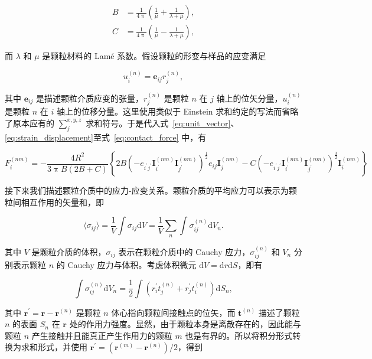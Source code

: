 \begin{align}
  B &= \frac{1}{4\uppi}\left(\frac{1}{\mu} + \frac{1}{\lambda + \mu}\right),\\
  C &= \frac{1}{4\uppi}\left(\frac{1}{\mu} - \frac{1}{\lambda + \mu}\right),
\end{align}

而 $\lambda$ 和 $\mu$ 是颗粒材料的 Lamé 系数。假设颗粒的形变与样品的应变满足

\begin{equation}
  {u}_{i}^{(n)} = \mathbf{e}_{ij}{r}_{j}^{(n)}\label{eq:strain_displacement},
\end{equation}

其中 $\mathbf{e}_{ij}$ 是描述颗粒介质应变的张量，${r}_{j}^{(n)}$ 是颗粒 $n$ 在 $j$ 轴上的位矢分量，${u}_{i}^{(n)}$ 是颗粒 $n$ 在 $i$ 轴上的位移分量。这里使用类似于 Einstein 求和约定的写法而省略了原本应有的 $\sum_{j}^{x,y,z}$ 求和符号。于是代入式~\eqref{eq:unit_vector}、\eqref{eq:strain_displacement}至式~\eqref{eq:contact_force} 中，有

\begin{equation}
  F_{i}^{(nm)} = -\frac{4R^{2}}{3\uppi B(2B+C)}\left\{2B\left(-e_{i^{\prime}j^{\prime}}\mathbf{I}_{i^{\prime}}^{(nm)}\mathbf{I}_{j^{\prime}}^{(nm)}\right)^{\frac{1}{2}}e_{ij}\mathbf{I}_{j}^{(nm)} - C\left(-e_{i^{\prime}j^{\prime}}\mathbf{I}^{(nm)}_{i^{\prime}}\mathbf{I}_{j^{\prime}}^{(nm)}\right)^{\frac{3}{2}}\mathbf{I}_{i}^{(nm)}\right\}
\end{equation}

接下来我们描述颗粒介质中的应力-应变关系。颗粒介质的平均应力可以表示为颗粒间相互作用的矢量和，即

\begin{equation}
  \langle\sigma_{ij}\rangle = \frac{1}{V}\int\sigma_{ij}\mathrm{d}V = \frac{1}{V}\sum_{n}\int\sigma_{ij}^{(n)}\mathrm{d}V_{n}.
\end{equation}

其中 $V$ 是颗粒介质的体积，$\sigma_{ij}$ 表示在颗粒介质中的 Cauchy 应力，$\sigma_{ij}^{(n)}$ 和 $V_{n}$ 分别表示颗粒 $n$ 的 Cauchy 应力与体积。考虑体积微元 $\mathrm{d}V = \mathrm{d}r\mathrm{d}S$，即有

\begin{equation}
  \int\sigma_{ij}^{(n)}\mathrm{d}V_{n} = \frac{1}{2}\int\left(r_{i}^{\prime}t_{j}^{(n)} + r_{j}^{\prime}t_{i}^{(n)}\right)\mathrm{d}S_{n},
\end{equation}

其中 $\mathbf{r}^{\prime} = \mathbf{r} - \mathbf{r}^{(n)} $ 是颗粒 $n$ 体心指向颗粒间接触点的位矢，而 $\mathbf{t}^{(n)}$ 描述了颗粒 $n$ 的表面 $S_{n}$ 在 $\mathbf{r}$ 处的作用力强度。显然，由于颗粒本身是离散存在的，因此能与颗粒 $n$ 产生接触并且能真正产生作用力的颗粒 $m$ 也是有界的。所以将积分形式转换为求和形式，并使用 $\mathbf{r}^{\prime} = \left(\mathbf{r}^{(m)} - \mathbf{r}^{(n)}\right)/2$，得到

